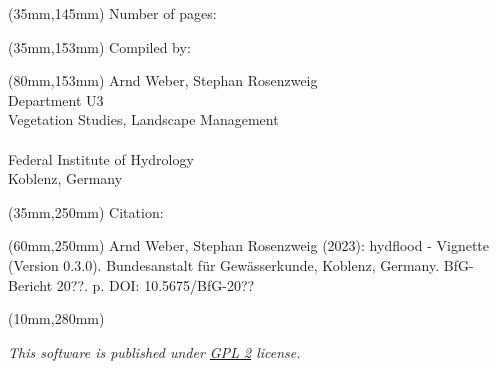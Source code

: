 \begin{titlepage}
    \begin{textblock*}{150mm}(35mm,145mm)
    \fontsize{15}{17}\selectfont\noindent
    Number of pages: \pageref*{LastPage}
    \end{textblock*}

    \begin{textblock*}{150mm}(35mm,153mm)
    \fontsize{15}{17}\selectfont\noindent
    Compiled by:
    \end{textblock*}

    \begin{textblock*}{95mm}(80mm,153mm)
    \fontsize{15}{17}\selectfont\noindent
    Arnd Weber, Stephan Rosenzweig \\
    Department U3 \\
    Vegetation Studies, Landscape Management \\
    \\
    Federal Institute of Hydrology \\
    Koblenz, Germany \\
    \end{textblock*}

    \begin{textblock*}{150mm}(35mm,250mm)
    \fontsize{10}{12}\selectfont\noindent
    Citation:
    \end{textblock*}

    \begin{textblock*}{120mm}(60mm,250mm)
    \fontsize{10}{12}\selectfont\noindent
    Arnd Weber, Stephan Rosenzweig (2023): hydflood - Vignette (Version 0.3.0). Bundesanstalt für Gewässerkunde, Koblenz, Germany. BfG-Bericht 20??. \pageref*{LastPage} p. DOI: 10.5675/BfG-20??
    \end{textblock*}

    \begin{textblock*}{190mm}(10mm,280mm)
    \fontsize{8}{9}\selectfont\noindent
    \begin{center}
    \textit{This software is published under \href{https://www.gnu.org/licenses/gpl-2.0}{GPL 2} license.}
    \end{center}
    \end{textblock*}
    ~
\end{titlepage}

\newpage

